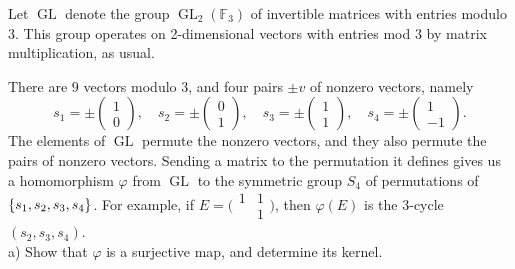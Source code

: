 \documentclass{article}
\theoremstyle{definition}
\newcommand{\F}{\mathbb{F}}
\newcommand{\GL}{\operatorname{GL}}
\DeclarePairedDelimiter\set{\{}{\}}
\begin{document}
\begin{tcolorbox}
Let $\GL$ denote the group $\GL_2(\F_3)$ of invertible matrices with entries modulo $3$.
This group operates on 2-dimensional vectors with entries mod $3$ by matrix multiplication, as usual.

There are $9$ vectors modulo $3$, and four pairs $\pm v$ of nonzero vectors, namely
\[
    s_1 =
    \pm \begin{pmatrix}
        1 \\
        0
    \end{pmatrix}, \quad
    s_2 =
    \pm \begin{pmatrix}
        0 \\
        1
    \end{pmatrix}, \quad
    s_3 =
    \pm \begin{pmatrix}
        1 \\
        1
    \end{pmatrix}, \quad
    s_4 =
    \pm \begin{pmatrix}
        1 \\
        -1
    \end{pmatrix}.
\]
The elements of $\GL$ permute the nonzero vectors, and they also permute the pairs of nonzero vectors.
Sending a matrix to the permutation it defines gives us a homomorphism $\varphi$ from $\GL$ to the symmetric group $S_4$ of permutations of $\set{s_1, s_2, s_3, s_4}$.
For example, if
$E =
    \bigl( \begin{smallmatrix}
    1 & 1 \\
      & 1
    \end{smallmatrix} \bigr)
$,
then $\varphi(E)$ is the 3-cycle $(s_2, s_3, s_4)$.
\\

a) Show that $\varphi$ is a surjective map, and determine its kernel.
\end{tcolorbox}
\end{document}
